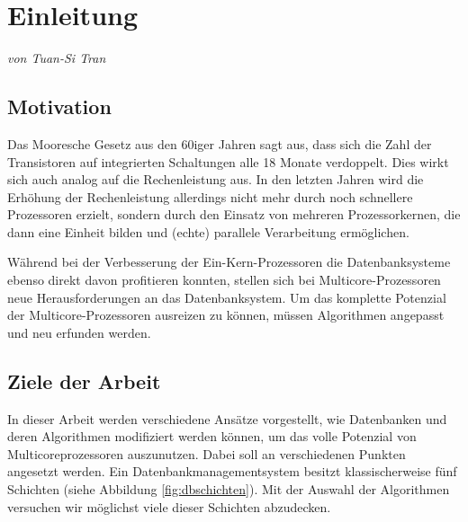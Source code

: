 \chapter{Einleitung}
\label{sec:Einleitung}
\textit{von Tuan-Si Tran}

\section{Motivation}
\label{sec:Motivation}
Das Mooresche Gesetz aus den 60iger Jahren sagt aus, dass sich die Zahl der Transistoren auf integrierten Schaltungen alle 18 Monate verdoppelt. Dies wirkt sich auch analog auf die Rechenleistung aus. In den letzten Jahren wird die Erhöhung der Rechenleistung allerdings nicht mehr durch noch schnellere Prozessoren erzielt, sondern durch den Einsatz von mehreren Prozessorkernen, die dann eine Einheit bilden und (echte) parallele Verarbeitung ermöglichen.

Während bei der Verbesserung der Ein-Kern-Prozessoren die Datenbanksysteme ebenso direkt davon profitieren konnten, stellen sich bei Multicore-Prozessoren neue Herausforderungen an das Datenbanksystem. Um das komplette Potenzial der Multicore-Prozessoren ausreizen zu können, müssen Algorithmen angepasst und neu erfunden werden.

\section{Ziele der Arbeit}
\label{sec:ZieleDerArbeit}
In dieser Arbeit werden verschiedene Ansätze vorgestellt, wie Datenbanken und deren Algorithmen modifiziert werden können, um das volle Potenzial von Multicoreprozessoren auszunutzen. Dabei soll an verschiedenen Punkten angesetzt werden. Ein Datenbankmanagementsystem besitzt klassischerweise fünf Schichten (siehe Abbildung \ref{fig:dbschichten}). Mit der Auswahl der Algorithmen versuchen wir möglichst viele dieser Schichten abzudecken.

